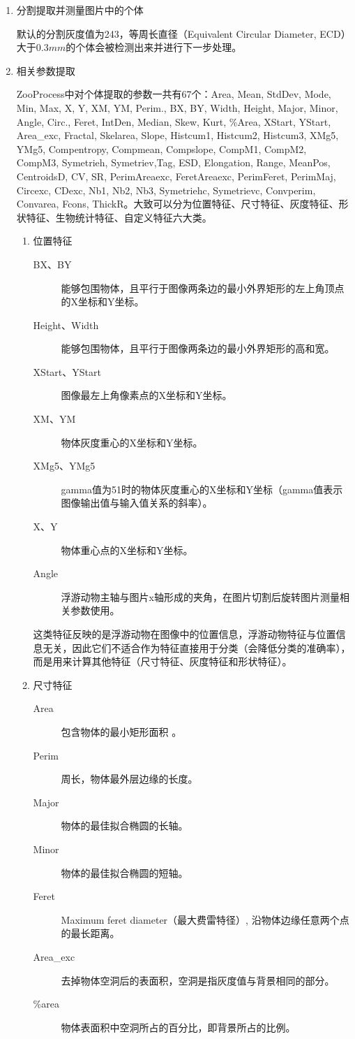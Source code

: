 \begin{enumerate}
对标准化后的原始图片和空白图片进行相减。

\item 分割提取并测量图片中的个体

默认的分割灰度值为243，等周长直径（Equivalent Circular Diameter, ECD）大于$0.3mm$的个体会被检测出来并进行下一步处理。

\item 相关参数提取

ZooProcess中对个体提取的参数一共有67个：Area, Mean, StdDev, Mode, Min, Max, X, Y, XM, YM, Perim., BX, BY, Width, Height, Major, Minor, Angle, Circ., Feret, IntDen, Median, Skew, Kurt, \%Area, XStart, YStart, Area\_exc, Fractal, Skelarea, Slope, Histcum1, Histcum2, Histcum3, XMg5, YMg5, Compentropy, Compmean, Compslope, CompM1, CompM2, CompM3, Symetrieh, Symetriev,Tag, ESD, Elongation, Range, MeanPos, CentroidsD, CV, SR, PerimAreaexc, FeretAreaexc, PerimFeret, PerimMaj, Circexc, CDexc, Nb1, Nb2, Nb3,  Symetriehc, Symetrievc, Convperim, Convarea, Fcons, ThickR。大致可以分为位置特征、尺寸特征、灰度特征、形状特征、生物统计特征、自定义特征六大类。

\begin{enumerate}
\item 位置特征
\begin{description}
\item[BX、BY] 能够包围物体，且平行于图像两条边的最小外界矩形的左上角顶点的X坐标和Y坐标。
\item[Height、Width] 能够包围物体，且平行于图像两条边的最小外界矩形的高和宽。
\item[XStart、YStart] 图像最左上角像素点的X坐标和Y坐标。
\item[XM、YM] 物体灰度重心的X坐标和Y坐标。
\item[XMg5、YMg5] gamma值为51时的物体灰度重心的X坐标和Y坐标（gamma值表示图像输出值与输入值关系的斜率）。
\item[X、Y] 物体重心点的X坐标和Y坐标。
\item[Angle] 浮游动物主轴与图片x轴形成的夹角，在图片切割后旋转图片测量相关参数使用。
\end{description}
这类特征反映的是浮游动物在图像中的位置信息，浮游动物特征与位置信息无关，因此它们不适合作为特征直接用于分类（会降低分类的准确率），而是用来计算其他特征（尺寸特征、灰度特征和形状特征）。

\item 尺寸特征

\begin{description}
\item[Area] 包含物体的最小矩形面积 。
\item[Perim] 周长，物体最外层边缘的长度。
\item[Major] 物体的最佳拟合椭圆的长轴。%
\item[Minor] 物体的最佳拟合椭圆的短轴。%
\item[Feret] Maximum feret diameter（最大费雷特径）, 沿物体边缘任意两个点的最长距离。
\item[Area\_exc] 去掉物体空洞后的表面积，空洞是指灰度值与背景相同的部分。
\item[\%area] 物体表面积中空洞所占的百分比，即背景所占的比例。
\end{description}


\end{enumerate}
\end{enumerate}
